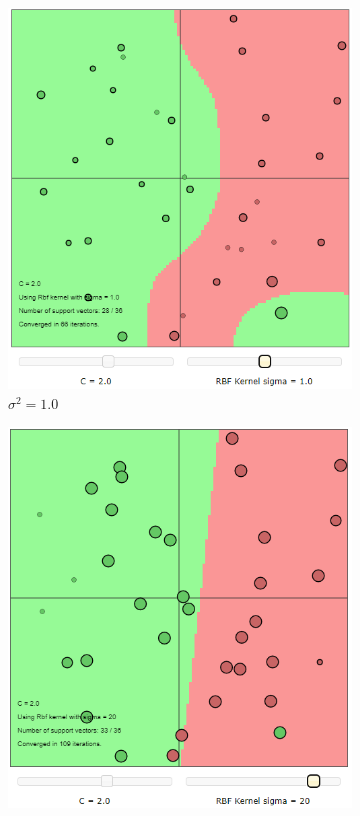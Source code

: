 \documentclass{article}
\begin{document}
\begin{figure}[h]
\begin{subfigure}[b]{0.3\textwidth}
                 \includegraphics[width=\textwidth]{Assignment 1/figures/RBF_medium_sigma.png}
                 \caption{$\sigma^2 = 1.0$}
                 \label{fig:medium_sigma}
             \end{subfigure}
             \hfill
             \begin{subfigure}[b]{0.3\textwidth}
                 \centering
                 \includegraphics[width=\textwidth]{Assignment 1/figures/RBF_high_sigma.png}

\end{subfigure}
\end{figure}
\end{document}
